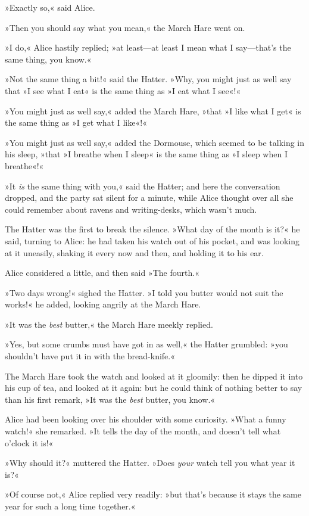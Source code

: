 »Exactly so,« said Alice.

»Then you should say what you mean,« the March Hare went on.

»I do,« Alice hastily replied; »at least—at least I mean what I say—that's the same thing, you know.«

»Not the same thing a bit!« said the Hatter. »Why, you might just as well say that »I see what I eat« is the same thing as »I eat what I see«!«

»You might just as well say,« added the March Hare, »that »I like what I get« is the same thing as »I get what I like«!«

»You might just as well say,« added the Dormouse, which seemed to be talking in his sleep, »that »I breathe when I sleep« is the same thing as »I sleep when I breathe«!«

»It \textit{is} the same thing with you,« said the Hatter; and here the conversation dropped, and the party sat silent for a minute, while Alice thought over all she could remember about ravens and writing-desks, which wasn't much.

The Hatter was the first to break the silence. »What day of the month is it?« he said, turning to Alice: he had taken his watch out of his pocket, and was looking at it uneasily, shaking it every now and then, and holding it to his ear.

Alice considered a little, and then said »The fourth.«

»Two days wrong!« sighed the Hatter. »I told you butter would not suit the works!« he added, looking angrily at the March Hare.

»It was the \textit{best} butter,« the March Hare meekly replied.

»Yes, but some crumbs must have got in as well,« the Hatter grumbled: »you shouldn't have put it in with the bread-knife.«

The March Hare took the watch and looked at it gloomily: then he dipped it into his cup of tea, and looked at it again: but he could think of nothing better to say than his first remark, »It was the \textit{best} butter, you know.«

Alice had been looking over his shoulder with some curiosity. »What a funny watch!« she remarked. »It tells the day of the month, and doesn't tell what o'clock it is!«

»Why should it?« muttered the Hatter. »Does \textit{your} watch tell you what year it is?«

»Of course not,« Alice replied very readily: »but that's because it stays the same year for such a long time together.«

